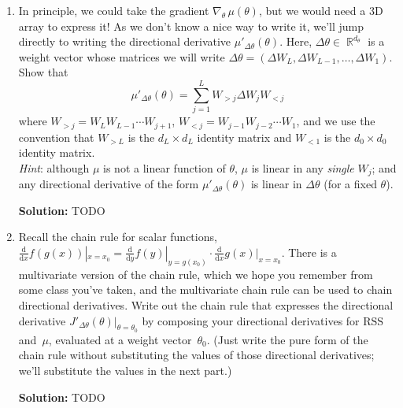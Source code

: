 \documentclass{article}
\DeclareMathOperator{\R}{\mathbb{R}}
\newenvironment{solution}{\color{blue} \smallskip \textbf{Solution:}}{}
\begin{document}
\begin{enumerate}
    \item
    In principle, we could take the gradient $\nabla_\theta \, \mu(\theta)$, but we would need a 3D array to express it!
    As we don't know a nice way to write it, we'll jump directly to writing the directional derivative $\mu'_{\Delta \theta}(\theta)$.
    Here, $\Delta \theta \in \R^{d_\theta}$ is a weight vector whose matrices we will write $\Delta \theta = (\Delta W_L, \Delta W_{L - 1}, \ldots, \Delta W_1)$.
    Show that
    \[
        \mu'_{\Delta \theta}(\theta) = \sum_{j=1}^L W_{>j} \Delta W_j W_{<j}
    \]
    where $W_{>j} = W_L W_{L-1} \cdots W_{j+1}$, $W_{<j} = W_{j-1} W_{j-2} \cdots W_1$, and we use the convention that $W_{>L}$ is the $d_L \times d_L$ identity matrix and $W_{<1}$ is the $d_0 \times d_0$ identity matrix. \\
    \textit{Hint}:  although $\mu$ is not a linear function of $\theta$, $\mu$ is linear in any {\em single} $W_j$; and any directional derivative of the form $\mu'_{\Delta \theta}(\theta)$ is linear in $\Delta \theta$ (for a fixed $\theta$).

    \begin{solution}
        TODO
    \end{solution}

    \item
    Recall the chain rule for scalar functions,
    $\frac{\mathrm{d}}{\mathrm{d}x} f(g(x))|_{x = x_0} =
    \frac{\mathrm{d}}{\mathrm{d}y} f(y)|_{y = g(x_0)} \cdot
    \frac{\mathrm{d}}{\mathrm{d}x} g(x)|_{x = x_0}$.
    There is a multivariate version of the chain rule, which we hope you remember from some class you've taken, and the multivariate chain rule can be used to chain directional derivatives.
    Write out the chain rule that expresses the directional derivative $J'_{\Delta \theta}(\theta)|_{\theta = \theta_0}$ by composing your directional derivatives for $\mathrm{RSS}$ and~$\mu$, evaluated at a weight vector~$\theta_0$.
    (Just write the pure form of the chain rule without substituting the values of those directional derivatives; we'll substitute the values in the next part.)

    \begin{solution}
        TODO
    \end{solution}


\end{enumerate}
\end{document}
